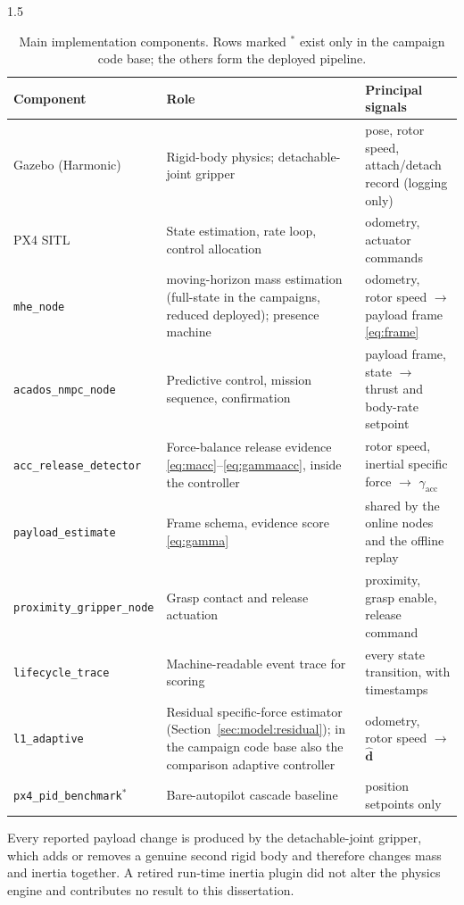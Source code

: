 \begin{spacing}{1.5}
\begin{table}[ht]
\centering
\caption[Main implementation components]{Main implementation components. Rows
marked $^{\ast}$ exist only in the campaign code base; the others form the
deployed pipeline.}
\label{tab:software}
\small
\begin{tabularx}{\textwidth}{@{}l X X@{}}
\toprule
\textbf{Component} & \textbf{Role} & \textbf{Principal signals} \\
\midrule
Gazebo (Harmonic) & Rigid-body physics; detachable-joint gripper &
pose, rotor speed, attach/detach record (logging only) \\
PX4 SITL & State estimation, rate loop, control allocation &
odometry, actuator commands \\
\texttt{mhe\_node} & moving-horizon mass estimation (full-state in the campaigns, reduced deployed); presence machine &
odometry, rotor speed $\rightarrow$ payload frame \eqref{eq:frame} \\
\texttt{acados\_nmpc\_node} & Predictive control, mission sequence, confirmation &
payload frame, state $\rightarrow$ thrust and body-rate setpoint \\
\texttt{acc\_release\_detector} & Force-balance release evidence
\eqref{eq:macc}--\eqref{eq:gammaacc}, inside the controller &
rotor speed, inertial specific force $\rightarrow$ $\gamma_{\mathrm{acc}}$ \\
\texttt{payload\_estimate} & Frame schema, evidence score \eqref{eq:gamma} &
shared by the online nodes and the offline replay \\
\texttt{proximity\_gripper\_node} & Grasp contact and release actuation &
proximity, grasp enable, release command \\
\texttt{lifecycle\_trace} & Machine-readable event trace for scoring &
every state transition, with timestamps \\
\texttt{l1\_adaptive} & Residual specific-force estimator
(Section~\ref{sec:model:residual}); in the campaign code base also the
comparison adaptive controller &
odometry, rotor speed $\rightarrow$ $\hat{\bm d}$ \\
\texttt{px4\_pid\_benchmark}$^{\ast}$ & Bare-autopilot cascade baseline &
position setpoints only \\
\bottomrule
\end{tabularx}
\end{table}

Every reported payload change is produced by the detachable-joint gripper,
which adds or removes a genuine second rigid body and therefore changes mass and
inertia together. A retired run-time inertia plugin did not alter the physics
engine and contributes no result to this dissertation.


\end{spacing}
